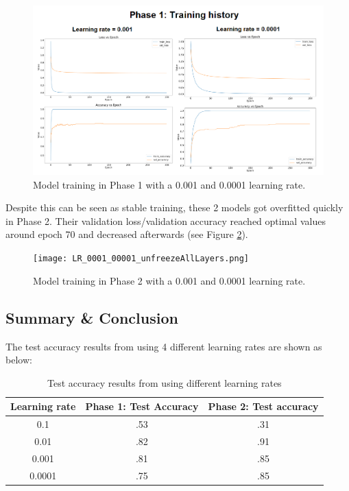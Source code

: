 \documentclass[]{article}
\begin{document}
\begin{figure}[H]
  \includegraphics[scale=.37]{LR_0001_00001.png}
  \centering
  \caption{Model training in Phase 1 with a 0.001 and 0.0001 learning rate.}
  \label{fig:LR001andLR0001}
\end{figure}

Despite this can be seen as stable training, these 2 models got overfitted quickly in Phase 2. Their validation loss/validation accuracy reached optimal values around epoch 70 and decreased afterwards (see Figure \ref{fig:LR001andLR0001_P2}).

\begin{figure}[H]
  \texttt{[image: LR\_0001\_00001\_unfreezeAllLayers.png]}
  \centering
  \caption{Model training in Phase 2 with a 0.001 and 0.0001 learning rate.}
  \label{fig:LR001andLR0001_P2}
\end{figure}


\subsection{Summary \& Conclusion}

The test accuracy results from using 4 different learning rates are shown as below:
    \begin{table}[H]
    \centering
    \begin{tabular}{ | c | c | c |}
        \hline
        Learning rate & Phase 1: Test Accuracy & Phase 2: Test accuracy \\ 
      \hline
        0.1 & .53 & .31 \\ 
      \hline
        0.01 & .82 & .91 \\   
      \hline
        0.001 & .81 & .85 \\ 
      \hline
        0.0001 & .75 & .85 \\  
      \hline
    \end{tabular}
    \caption{Test accuracy results from using different learning rates}
    \label{tab:LRTestAccuracy}
    \end{table}
    
\end{document}
